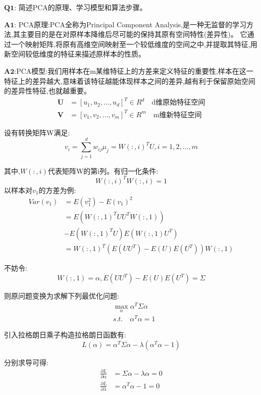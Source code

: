 \documentclass[homework]{IEEEtran}
\begin{document}
\begin{CJK}{UTF8}{gkai}
$\mathbf{Q1}$: 简述PCA的原理、学习模型和算法步骤。 \par
$\mathbf{A1}$: PCA原理:PCA全称为Principal Component Analysis,是一种无监督的学习方法,其主要目的是在对原样本降维后尽可能的保持其原有空间特性(差异性)。
它通过一个映射矩阵,将原有高维空间映射至一个较低维度的空间之中,并提取其特征,用新空间较低维度的特征来描述原样本的性质。 \par
$\mathbf{A2}$:PCA模型:我们用样本在m某维特征上的方差来定义特征的重要性,样本在这一特征上的差异越大,意味着该特征越能体现样本之间的差异,越有利于保留原始空间的差异性特征,也就越重要。
\begin{align*}
\mathbf{U} &= \left[ u_1,u_2, \dots,u_d \right]^T \in R^d \quad  \text{d维原始特征空间} \\
\mathbf{V} &= \left[ v_1,v_2, \dots,v_m \right]^T \in R^m \quad \text{m维新特征空间}
\end{align*} \par
设有转换矩阵W满足:
$$
v_i = \sum\limits_{j=1}^{d}w_{ij}\mu_{j}=W(:,i)^TU, i=1,2,\dots,m
$$\par
其中,$W(:,i)$代表矩阵W的第i列。有归一化条件:
$$
W(:,i)^TW(:,i)=1
$$
以样本对$v_1$的方差为例:
\begin{align*}
Var(v_1) &= E(v_{1}^{2}) - E(v_1)^2 \\
		  &=E\left(W(:,1)^TUU^TW(:,1)\right) \\
          &-E\left(W(:,1)^TU \right)E\left(W(:,1)U^T\right) \\
		  &= W(:,1)^T \left(E(UU^T)-E(U)E(U^T) \right)W(:,1)
\end{align*}\par
不妨令:
$$
W(:,1) = \alpha, \dot E(UU^T)-E(U)E(U^T) = \Sigma
$$\par
则原问题变换为求解下列最优化问题:
\begin{align*}
&\max_{\alpha} \alpha^T \Sigma \alpha \\
&s.t. \quad \alpha^T \alpha =1
\end{align*}\par
引入拉格朗日乘子构造拉格朗日函数有:
$$
L(\alpha) = \alpha^T \Sigma \alpha - \lambda(\alpha^T \alpha -1)
$$\par
分别求导可得:
\begin{align*}
\frac{\partial L}{\partial \alpha} &=\Sigma \alpha-\lambda \alpha=0 \\
\frac{\partial L}{\partial \lambda}&=\alpha^{T} \alpha-1=0
\end{align*}\par

\end{CJK}
\end{document}
